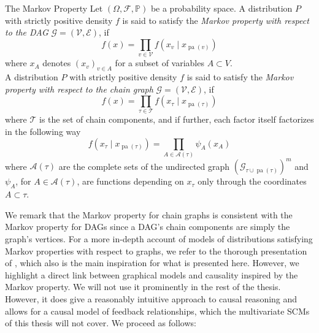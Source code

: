 \documentclass[11pt, a4paper]{memoir}
\theoremstyle{break}
\theoremstyle{break}
\theoremstyle{nonumberplain}
\newcommand{\mP}{\mathbb{P}}
\DeclareMathOperator{\pa}{pa}
\begin{document}
\begin{mydefinition}{The Markov Property}\label{Markov}
Let $(\Omega, \mathcal{F}, \mP)$ be a probability space. A distribution $P$ with strictly positive density $f$ is said to satisfy the \emph{Markov property with respect to the DAG} $\mathcal{G}=(\mathcal{V}, \mathcal{E})$, if
\begin{equation}\label{MPDAG}
f(x)=\prod_{v\in \mathcal{V}}f\left(x_v\mid x_{\pa(v)}\right)
\end{equation}
where $x_A$ denotes $(x_v)_{v\in A}$ for a subset of variables $A\subset V$.\\[5pt]
A distribution $P$ with strictly positive density $f$ is said to satisfy the \emph{Markov property with respect to the chain graph} $\mathcal{G}=(\mathcal{V}, \mathcal{E})$, if
\begin{equation}\label{MPCHAIN}
 f(x)=\prod_{\tau\in \mathscr{T}}f\left(x_\tau\mid x_{\pa(\tau)}\right)
\end{equation}
where $\mathscr{T}$ is the set of chain components, and if further, each factor itself factorizes in the following way
$$f\left(x_\tau\mid x_{\pa(\tau)}\right)=\prod_{A\in \mathscr{A}(\tau)}\psi_A\left(x_A\right)$$
where $\mathscr{A}(\tau)$ are the complete sets of the undirected graph $\left(\mathcal{G}_{\tau\cup\pa(\tau)}\right)^m$ and $\psi_A$, for $A\in \mathscr{A}(\tau)$, are functions depending on $x_\tau$ only through the coordinates $A\subset \tau$. 
\end{mydefinition}
We remark that the Markov property for chain graphs is consistent with the Markov property for DAGs since a DAG's chain components are simply the graph's vertices. For a more in-depth account of models of distributions satisfying Markov properties with respect to graphs, we refer to the thorough presentation of \cite{Steffen}, which also is the main inspiration for what is presented here. However, we highlight a direct link between graphical models and causality inspired by the Markov property. We will not use it prominently in the rest of the thesis. However, it does give a reasonably intuitive approach to causal reasoning and allows for a causal model of feedback relationships, which the multivariate SCMs of this thesis will not cover. We proceed as follows:
\end{document}
